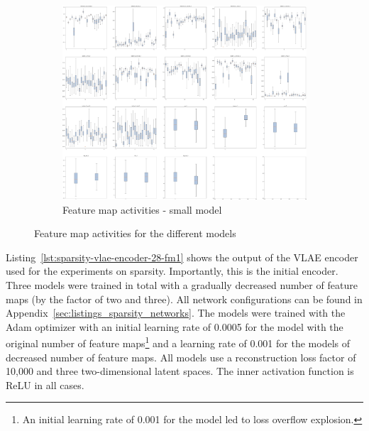 \begin{figure}
    \ContinuedFloat
    \centering
    \begin{subfigure}{.95\textwidth}
        \centering
        \includegraphics[width=\textwidth]{images/sparseness/encoder_fm3_fms.png}
        \caption{Feature map activities - small model}
    \end{subfigure}
    \caption{Feature map activities for the different models}
    \label{fig:fm_activities_sparseness}
\end{figure}

Listing~\ref{lst:sparsity-vlae-encoder-28-fm1} shows the output of the \ac{VLAE} encoder used for the experiments on sparsity.
Importantly, this is the initial encoder.
Three models were trained in total with a gradually decreased number of feature maps (by the factor of two and three).
All network configurations can be found in Appendix~\ref{sec:listings_sparsity_networks}.
The models were trained with the Adam optimizer with an initial learning rate of 0.0005 for the model with the original number of feature maps\footnote{An initial learning rate of 0.001 for the  model led to loss overflow explosion.} and a learning rate of 0.001 for the models of decreased number of feature maps.
All models use a reconstruction loss factor of 10,000 and three two-dimensional latent spaces.
The inner activation function is ReLU in all cases.

